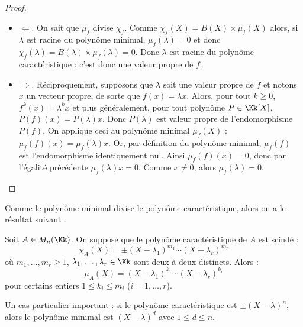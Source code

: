 \documentclass[12pt, class=report,crop=false]{standalone}
\begin{document}
\begin{proof}~
\begin{itemize}
  \item $\Longleftarrow$.
On sait que $\mu_f$ divise $\chi_f$. Comme $\chi_f(X) = B(X) \times \mu_f(X)$
alors, si $\lambda$ est racine du polynôme minimal, $\mu_f(\lambda) = 0$ et
donc $\chi_f(\lambda) = B(\lambda) \times \mu_f(\lambda) = 0$. Donc $\lambda$ est racine du polynôme caractéristique : c'est donc une valeur propre de $f$.


  \item $\Longrightarrow$.
Réciproquement, supposons que $\lambda$ soit une valeur propre de $f$ et notons $x$ un vecteur propre, de sorte que $f(x) = \lambda x$. Alors, pour tout $k\ge0$,
$f^k(x) = \lambda^k x$ et plus généralement, pour tout polynôme $P \in \Kk[X]$, $P(f)(x) = P(\lambda) x$.
Donc $P(\lambda)$ est valeur propre de l'endomorphisme $P(f)$.
On applique ceci au polynôme minimal $\mu_f(X)$ : 
$\mu_f(f)(x) = \mu_f(\lambda) x$.
Or, par définition du polynôme minimal, $\mu_f(f)$ est l'endomorphisme identiquement nul.
Ainsi $\mu_f(f)(x) = 0$, donc par l'égalité précédente $\mu_f(\lambda) x = 0$. Comme $x\neq0$, alors $\mu_f(\lambda)=0$. 

\end{itemize}
\end{proof}



\bigskip



Comme le polynôme minimal divise le polynôme caractéristique, alors on a le résultat suivant :
\begin{lemme}
Soit $A \in M_n(\Kk)$. On suppose que le polynôme caractéristique de $A$ est scindé :
\[\chi_A(X) = \pm(X-\lambda_1)^{m_1}\cdots(X-\lambda_r)^{m_r}\]
où $m_1,\ldots,m_r \ge 1$, $\lambda_1,\ldots,\lambda_r \in \Kk$ sont deux à deux distincts. Alors :
\[\mu_A(X) = (X-\lambda_1)^{k_1}\cdots(X-\lambda_r)^{k_r}\]
pour certains entiers $1 \le k_i\le m_i$ ($i=1,\ldots,r$). 
\end{lemme}


Un cas particulier important :
si le polynôme caractéristique est $\pm(X-\lambda)^n$, alors le polynôme minimal est
$(X-\lambda)^d$ avec $1 \le d \le n$.
\end{document}
